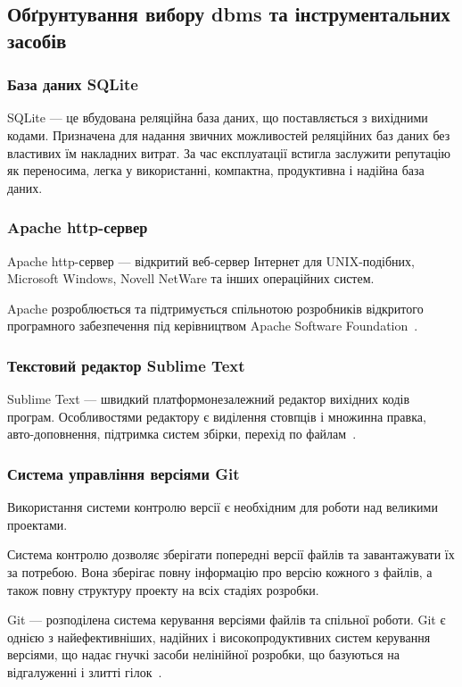 \subsection{Обґрунтування вибору \acrshort{dbms} та інструментальних засобів}

\subsubsection{База даних SQLite}
SQLite --- це вбудована реляційна база даних, що поставляється з вихідними кодами.
Призначена для надання звичних можливостей реляційних баз даних без властивих їм накладних витрат.
За час експлуатації встигла заслужити репутацію як переносима, легка у використанні, компактна, продуктивна і надійна база даних\cite{SQLite2006a}.

\subsubsection{Apache \acrshort{http}-сервер}
Apache \acrshort{http}-сервер --- відкритий веб-сервер Інтернет для UNIX-подібних, Microsoft Windows, Novell NetWare та інших операційних систем.

Apache розроблюється та підтримується спільнотою розробників відкритого програмного забезпечення під керівництвом Apache Software Foundation~\cite{ApacheServer}.

\subsubsection{Текстовий редактор Sublime Text}
Sublime Text --- швидкий платформонезалежний редактор вихідних кодів програм.
Особливостями редактору є виділення стовпців і множинна правка, авто-доповнення, підтримка систем збірки, перехід по файлам~\cite{SublimeText}.

\subsubsection{Система управління версіями Git}
Використання системи контролю версії є необхідним для роботи над великими проектами.

Система контролю дозволяє зберігати попередні версії файлів та завантажувати їх за потребою. 
Вона зберігає повну інформацію про версію кожного з файлів, а також повну структуру проекту на всіх стадіях розробки.

Git --- розподілена система керування версіями файлів та спільної роботи.
Git є однією з найефективніших, надійних і високопродуктивних систем керування версіями, що надає гнучкі засоби нелінійної розробки, що базуються на відгалуженні і злитті гілок~\cite{Chacon2009}.
